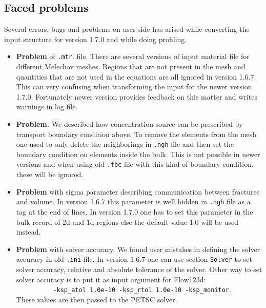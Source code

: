 \subsection{Faced problems}
Several errors, bugs and problems on user side has arised while converting the 
input structure for version 1.7.0 and while doing profiling. 

\begin{itemize}
  \item \textbf{Problem} of \verb'.mtr'. file. There are several versions of input material file for 
        different Melechov meshes. Regions that are not present in the mesh and quantities that are not used in
        the equations are all ignored in version 1.6.7. This can very confusing when transforming the input
        for the newer version 1.7.0. Fortunately newer version provides feedback on this matter and writes
        warnings in log file.

  \item \textbf{Problem.} We described how concentration source can be prescribed by transport boundary condition above.
        To remove the elements from the mesh one used to only delete the neighborings in \verb'.ngh' file and then
        set the boundary condition on elements inside the bulk. This is not possible in newer versions and when using
        old \verb'.fbc' file with this kind of boundary condition, these  will be ignored.
  
  \item \textbf{Problem} with sigma parameter describing communication between fractures and volume.
        In version 1.6.7 this parameter is well hidden in \verb'.ngh' file as a tag at the end of
        lines. In version 1.7.0 one has to set this parameter in the bulk record of 2d and 1d regions 
        else the default value 1.0 will be used instead. 

  \item \textbf{Problem} with solver accuracy. We found user mistakes in defining the solver accuracy in 
        old \verb'.ini' file. In version 1.6.7 one can use section \verb'Solver' to set solver accuracy,
        relative and absolute tolerance of the solver. Other way to set solver accuracy is to put it as
        input argument for Flow123d: \\
        \verb'          -ksp_atol 1.0e-10 -ksp_rtol 1.0e-10 -ksp_monitor'. \\
        These values are then passed to the PETSC solver.
        
  

\end{itemize}
